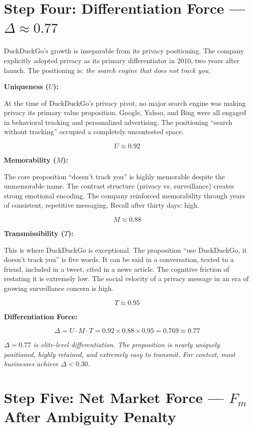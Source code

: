 \documentclass[12pt, openany]{book}
\theoremstyle{thmstyle}
\theoremstyle{defstyle}
\begin{document}
\section{Step Four: Differentiation Force --- $\Delta \approx 0.77$}

DuckDuckGo's growth is inseparable from its privacy positioning. The company explicitly adopted privacy as its primary differentiator in 2010, two years after launch. The positioning is: \textit{the search engine that does not track you}.

\textbf{Uniqueness ($U$):}

At the time of DuckDuckGo's privacy pivot, no major search engine was making privacy its primary value proposition. Google, Yahoo, and Bing were all engaged in behavioral tracking and personalized advertising. The positioning ``search without tracking'' occupied a completely uncontested space.

\[
U \approx 0.92
\]

\textbf{Memorability ($M$):}

The core proposition ``doesn't track you'' is highly memorable despite the unmemorable name. The contrast structure (privacy vs. surveillance) creates strong emotional encoding. The company reinforced memorability through years of consistent, repetitive messaging. Recall after thirty days: high.

\[
M \approx 0.88
\]

\textbf{Transmissibility ($T$):}

This is where DuckDuckGo is exceptional. The proposition ``use DuckDuckGo, it doesn't track you'' is five words. It can be said in a conversation, texted to a friend, included in a tweet, cited in a news article. The cognitive friction of restating it is extremely low. The social velocity of a privacy message in an era of growing surveillance concern is high.

\[
T \approx 0.95
\]

\textbf{Differentiation Force:}
\begin{calcbox}
\[
\Delta = U \cdot M \cdot T = 0.92 \times 0.88 \times 0.95 = \mathbf{0.769} \approx 0.77
\]

\textit{$\Delta = 0.77$ is elite-level differentiation. The proposition is nearly uniquely positioned, highly retained, and extremely easy to transmit. For context, most businesses achieve $\Delta < 0.30$.}
\end{calcbox}

\section{Step Five: Net Market Force --- $F_m$ After Ambiguity Penalty}
\end{document}
